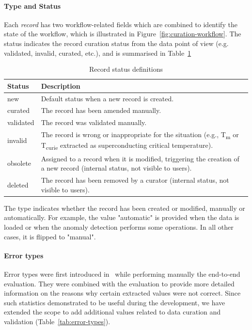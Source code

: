 \documentclass[a4paper]{article}
\begin{document}
\paragraph{Type and Status} Each \textit{record} has two workflow-related fields which are combined to identify the state of the workflow, which is illustrated in Figure~\ref{fig:curation-workflow}. 
The status indicates the record curation status from the data point of view (e.g. validated, invalid, curated, etc.), and is summarised in Table~\ref{tab:record-status}

\begin{table}[htbp]
\centering
\begin{tabular}{lp{10cm}}
\toprule
\textbf{Status} & \textbf{Description} \\
\midrule
new & Default status when a new record is created. \\
curated & The record has been amended manually. \\
validated & The record was validated manually. \\
invalid & The record is wrong or inappropriate for the situation (e.g., T\textsubscript{m} or T\textsubscript{curie} extracted as superconducting critical temperature). \\
obsolete & Assigned to a record when it is modified, triggering the creation of a new record (internal status, not visible to users).\\
deleted & The record has been removed by a curator (internal status, not visible to users). \\
\bottomrule
\end{tabular}
\caption{Record status definitions}
\label{tab:record-status}
\end{table}
    
The type indicates whether the record has been created or modified, manually or automatically. 
For example, the value "automatic" is provided when the data is loaded or when the anomaly detection performs some operations. In all other cases, it is flipped to "manual". 

\paragraph{Error types} Error types were first introduced in~\cite{lfoppiano2023automatic} while performing manually the end-to-end evaluation. They were combined with the evaluation to provide more detailed information on the reasons why certain extracted values were not correct. 
Since such statistics demonstrated to be useful during the development, we have extended the scope to add additional values related to data curation and validation (Table~\ref{tab:error-types}).
\end{document}
